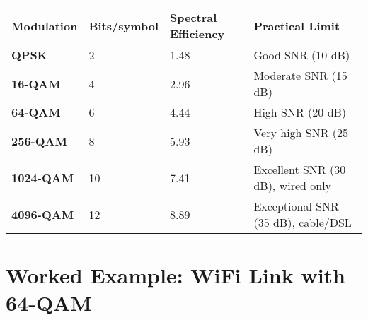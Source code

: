 {\def\LTcaptype{} %
\begin{longtable}[]{@{}llll@{}}
\toprule\noalign{}
Modulation & Bits/symbol & Spectral Efficiency & Practical Limit \\
\midrule\noalign{}
\endhead
\bottomrule\noalign{}
\endlastfoot
\textbf{QPSK} & 2 & 1.48 & Good SNR (10 dB) \\
\textbf{16-QAM} & 4 & 2.96 & Moderate SNR (15 dB) \\
\textbf{64-QAM} & 6 & 4.44 & High SNR (20 dB) \\
\textbf{256-QAM} & 8 & 5.93 & Very high SNR (25 dB) \\
\textbf{1024-QAM} & 10 & 7.41 & Excellent SNR (30 dB), wired only \\
\textbf{4096-QAM} & 12 & 8.89 & Exceptional SNR (35 dB), cable/DSL \\
\end{longtable}
}

\section{Worked Example: WiFi Link with 64-QAM}

